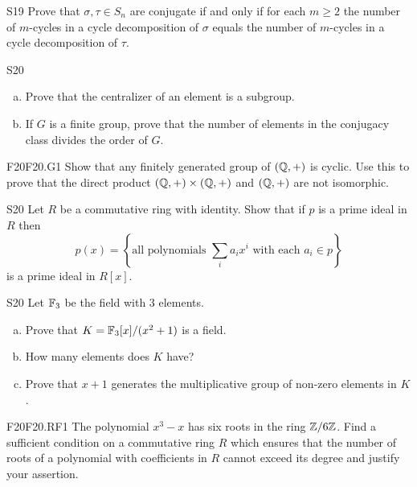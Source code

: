 \documentclass[../AlgebraQualSolutions.tex]{subfiles}
\begin{document}
	
	\begin{prob}{S19}{}
	Prove that $\sigma,\tau \in S_n$ are conjugate if and only if for each $m \geq 2$ the number of $m$-cycles in a cycle decomposition of $\sigma$ equals the number of $m$-cycles in a cycle decomposition of $\tau$.
	\end{prob}
	
	\begin{prob}{S20}{}
	\begin{enumerate}[(a)]
	\item Prove that the centralizer of an element is a subgroup.
	\item If $G$ is a finite group, prove that the number of elements in the conjugacy class divides the order of $G$.
	\end{enumerate}
	\end{prob}
	
	\begin{prob}{F20}{F20.G1}
	Show that any finitely generated group of $(\mathbb{Q},+)$ is cyclic. Use this to prove that the direct product $(\mathbb{Q},+) \times (\mathbb{Q},+)$ and $(\mathbb{Q},+)$ are not isomorphic.
	\end{prob}

	\begin{prob}{S20}{}
	Let $R$ be a commutative ring with identity. Show that if $p$ is a prime ideal in $R$ then
		\[p(x) = \left\{\textrm{all polynomials } \sum_i a_ix^i \textrm{ with each } a_i \in p \right\} \]
	is a prime ideal in $R[x]$.
	\end{prob}
	
	\begin{prob}{S20}{}
	Let $\mathbb{F}_3$ be the field with 3 elements.
	\begin{enumerate}[(a)]
	\item Prove that $K = \mathbb{F}_3[x]/(x^2 + 1)$ is a field.
	\item How many elements does $K$ have?
	\item Prove that $x+1$ generates the multiplicative group of non-zero elements in $K$.
	\end{enumerate}
	\end{prob}

	
	\begin{prob}{F20}{F20.RF1}
	The polynomial $x^3 - x$ has six roots in the ring $\mathbb{Z}/6\mathbb{Z}$. Find a sufficient condition on a commutative ring $R$ which ensures that the number of roots of a polynomial with coefficients in $R$ cannot exceed its degree and justify your assertion.
	\end{prob}
	
\end{document}
